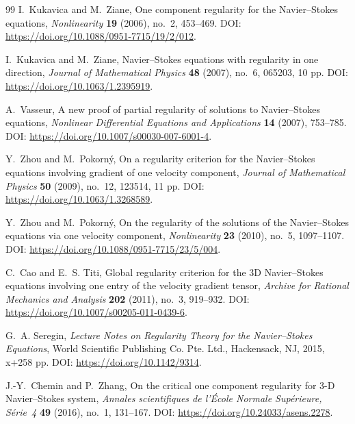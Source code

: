 \documentclass[11pt]{article}
\numberwithin{equation}{section}
\begin{document}
\begin{thebibliography}{99}
I.~Kukavica and M.~Ziane,
\newblock One component regularity for the Navier--Stokes equations,
\newblock \emph{Nonlinearity} \textbf{19} (2006), no.~2, 453--469.
\newblock DOI: \url{https://doi.org/10.1088/0951-7715/19/2/012}.

I.~Kukavica and M.~Ziane,
\newblock Navier--Stokes equations with regularity in one direction,
\newblock \emph{Journal of Mathematical Physics} \textbf{48} (2007), no.~6, 065203, 10 pp.
\newblock DOI: \url{https://doi.org/10.1063/1.2395919}.

A.~Vasseur,
\newblock A new proof of partial regularity of solutions to Navier--Stokes equations,
\newblock \emph{Nonlinear Differential Equations and Applications} \textbf{14} (2007), 753--785.
\newblock DOI: \url{https://doi.org/10.1007/s00030-007-6001-4}.

Y.~Zhou and M.~Pokorn\'y,
\newblock On a regularity criterion for the Navier--Stokes equations involving gradient of one velocity component,
\newblock \emph{Journal of Mathematical Physics} \textbf{50} (2009), no.~12, 123514, 11 pp.
\newblock DOI: \url{https://doi.org/10.1063/1.3268589}.

Y.~Zhou and M.~Pokorn\'y,
\newblock On the regularity of the solutions of the Navier--Stokes equations via one velocity component,
\newblock \emph{Nonlinearity} \textbf{23} (2010), no.~5, 1097--1107.
\newblock DOI: \url{https://doi.org/10.1088/0951-7715/23/5/004}.

C.~Cao and E.~S. Titi,
\newblock Global regularity criterion for the 3D Navier--Stokes equations involving one entry of the velocity gradient tensor,
\newblock \emph{Archive for Rational Mechanics and Analysis} \textbf{202} (2011), no.~3, 919--932.
\newblock DOI: \url{https://doi.org/10.1007/s00205-011-0439-6}.

G.~A. Seregin,
\newblock \emph{Lecture Notes on Regularity Theory for the Navier--Stokes Equations},
\newblock World Scientific Publishing Co. Pte. Ltd., Hackensack, NJ, 2015, x+258 pp.
\newblock DOI: \url{https://doi.org/10.1142/9314}.

J.-Y.~Chemin and P.~Zhang,
\newblock On the critical one component regularity for 3-D Navier--Stokes system,
\newblock \emph{Annales scientifiques de l'\'Ecole Normale Sup\'erieure, S\'erie~4} \textbf{49} (2016), no.~1, 131--167.
\newblock DOI: \url{https://doi.org/10.24033/asens.2278}.


\end{thebibliography}
\end{document}
